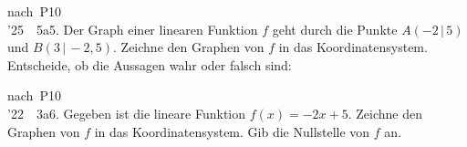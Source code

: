 \documentclass[11pt]{article}
\newcommand{\gzwei}[2]{\par\smallskip\noindent\sbox{\gbox}{#1}%
  \setlength{\gLinks}{\dimexpr\wd\gbox+6mm\relax}%
  \ifdim\gLinks>0.62\linewidth
    \usebox{\gbox}\par\smallskip\noindent\begin{minipage}{\linewidth}#2\end{minipage}%
  \else
    \begin{minipage}[t]{\gLinks}\vspace{0pt}\usebox{\gbox}\end{minipage}%
    \begin{minipage}[t]{\dimexpr\linewidth-\gLinks\relax}\vspace{0pt}\raggedright #2\end{minipage}%
  \fi\par}
\def\gkopfnach{}
\newcommand{\gkopfvor}[1]{\gdef\gkopfnach{#1}}
\newcommand{\linie}[1]{\,{\color{black!45}\rule[-1pt]{#1}{0.4pt}}\,}
\newcommand{\pkt}{\textperiodcentered{}}
\newcommand{\gwahrfalsch}[2]{\par\noindent\hangindent2.2em\hangafter1\makebox[2.2em][l]{(#1)}#2\hfill\mbox{wahr $\square$\quad falsch $\square$}\par}
\begin{document}
\gkopfvor{\gbstvor{C}\pfstufekopf{Gleichung aus zwei Punkten}{\gpunkte[25]{\textcolor{black!25}{$\circ$}\,\textcolor{black!80}{$\bullet$}\,\textcolor{black!25}{$\circ$}\,\textcolor{black!25}{$\circ$}\,\textcolor{black!25}{$\circ$}}}\special{pdf:dest (stufe-gleichung-aus-zwei-punkten) [@thispage /XYZ @xpos @ypos null]}}
\begin{pfaufg}{nach~P10\\’25~\pkt{}~5a}{5.}{}
Der Graph einer linearen Funktion $f$ geht durch die Punkte $A(-2\,|\,5)$ und $B(3\,|\,-2{,}5)$. Zeichne den Graphen von $f$ in das Koordinatensystem. Entscheide, ob die Aussagen wahr oder falsch sind:
\gzwei{\begin{ksys}[xmin=-4,xmax=4,ymin=-4,ymax=8,karo=0.5]\end{ksys}}{\vspace{1mm}\gwahrfalsch{1}{Der Graph von $f$ steigt monoton.}\gwahrfalsch{2}{Der Graph von $f$ schneidet die y-Achse in $(0\,|\,2)$}\par\smallskip\noindent Gib eine Gleichung von $f$ an.\par\smallskip\noindent y $=$\linie{40mm}}
\end{pfaufg}

\gkopfvor{\gbstvor{D}\pfstufekopf{Nullstelle gesucht}{\gpunkte[22]{\textcolor{black!25}{$\circ$}\,\textcolor{black!25}{$\circ$}\,\textcolor{black!25}{$\circ$}\,\textcolor{black!25}{$\circ$}\,\textcolor{black!80}{$\bullet$}}}\special{pdf:dest (stufe-nullstelle-gesucht) [@thispage /XYZ @xpos @ypos null]}}
\begin{pfaufg}{nach~P10\\’22~\pkt{}~3a}{6.}{}
Gegeben ist die lineare Funktion $f(x) = -2x + 5$. Zeichne den Graphen von $f$ in das Koordinatensystem. Gib die Nullstelle von $f$ an.
\gzwei{\begin{ksys}[xmin=-4,xmax=5,ymin=-4,ymax=7,karo=0.5]\end{ksys}}{\vspace{1mm}\par\smallskip\noindent \mbox{x $=$\linie{30mm}}}
\end{pfaufg}
\end{document}
